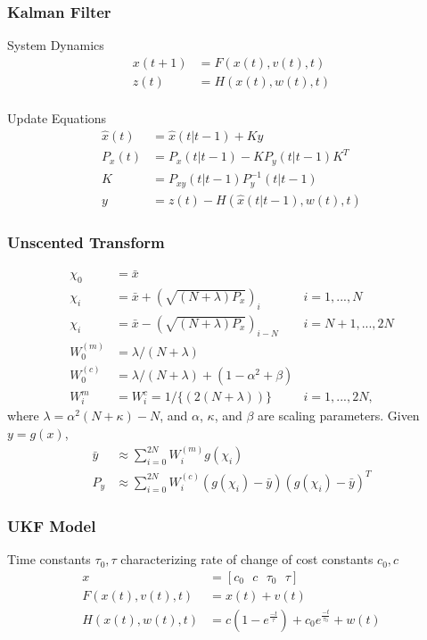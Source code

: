 \documentclass[compress, xcolor=pst]{beamer}
\begin{document}
\begin{frame}
	\frametitle{\textbf{Kalman Filter}}
	System Dynamics
	\begin{align*}
	  x(t+1) &= F(x(t), v(t), t)\\
	  z(t) &= H(x(t), w(t), t)\\
	\end{align*}

	Update Equations
	\begin{align*}
	  \hat{x}(t) &= \hat{x}(t\vert t-1) + Ky \\
	  P_{x}(t) &= P_{x}(t\vert t-1) - KP_{y}(t\vert t-1) K^T\\
	  K &= P_{xy}(t\vert t-1) P_{y}^{-1}(t\vert t-1)\\
	  y &= z(t) - H(\hat{x}(t\vert t-1) , w(t), t)
	\end{align*}
\end{frame}

\begin{frame}
	\frametitle{\textbf{Unscented Transform}}
	\vspace{-2em}
	\begin{align*}
	  \chi_0 &= \bar{x}\\
	  \chi_i &= \bar{x} + (\sqrt{(N + \lambda)P_x})_i & i = 1, ..., N \\
	  \chi_i &= \bar{x} - (\sqrt{(N + \lambda)P_x})_{i-N} & i = N + 1, ..., 2N\\
	  W_0^{(m)} &= \lambda /(N + \lambda) \\
	  W_0^{(c)} &= \lambda /(N + \lambda) + (1- \alpha^2 + \beta)\\
	  W_i^m &= W_i^c = 1/\{(2(N + \lambda))\} & i = 1, ..., 2N,
	\end{align*}
	where $\lambda = \alpha^2(N + \kappa) - N$, and $\alpha$, $\kappa$, and $\beta$ are scaling parameters. Given $y=g(x)$,
	\begin{align*}
	  \bar{y} &\approx \sum_{i=0}^{2N} W_i^{(m)}g(\chi_i)\\
	  P_y &\approx \sum_{i=0}^{2N} W_i^{(c)}(g(\chi_i) - \bar{y})(g(\chi_i) - \bar{y})^T
	\end{align*}
\end{frame}

\begin{frame}
	\frametitle{\textbf{UKF Model}}
	Time constants $\tau_0, \tau$ characterizing rate of change of cost constants $c_0, c$
	\begin{align*}
		x &= [c_0 \text{ } c \text{ } \tau_0 \text{ } \tau]\\
	    F(x(t), v(t), t) &= x(t) + v(t)\\
	    H(x(t), w(t), t) &= c(1-e^{\frac{-t}{\tau}}) + c_0e^{\frac{-t}{\tau_0}} + w(t)
	\end{align*}
\end{frame}
\end{document}
